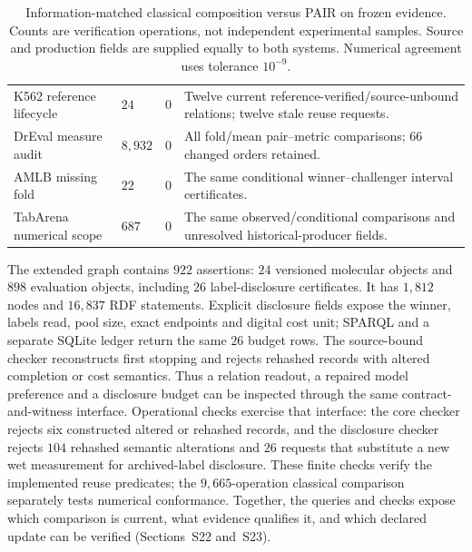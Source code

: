 \begin{table}[htbp]
\centering\small{}
\caption{Information-matched classical composition versus PAIR on frozen evidence. Counts are verification operations, not independent experimental samples. Source and production fields are supplied equally to both systems. Numerical agreement uses tolerance $10^{-9}$.}
\label{tab:matchedsystems}
\begin{tabularx}{\textwidth}{@{}L{0.22\textwidth}N{0.12\textwidth}N{0.15\textwidth}X@{}}
\toprule
{} &  &  & \\\midrule
K562 reference lifecycle & $24$ & $0$ & Twelve current reference-verified/source-unbound relations; twelve stale reuse requests.\\
DrEval measure audit & $8{,}932$ & $0$ & All fold/mean pair--metric comparisons; $66$ changed orders retained.\\
AMLB missing fold & $22$ & $0$ & The same conditional winner--challenger interval certificates.\\
TabArena numerical scope & $687$ & $0$ & The same observed/conditional comparisons and unresolved historical-producer fields.\\\bottomrule
\end{tabularx}
\end{table}

The extended graph contains $922$ assertions: $24$ versioned molecular objects and $898$ evaluation objects, including $26$ label-disclosure certificates. It has $1{,}812$ nodes and $16{,}837$ RDF statements. Explicit disclosure fields expose the winner, labels read, pool size, exact endpoints and digital cost unit; SPARQL and a separate SQLite ledger return the same $26$ budget rows. The source-bound checker reconstructs first stopping and rejects rehashed records with altered completion or cost semantics. Thus a relation readout, a repaired model preference and a disclosure budget can be inspected through the same contract-and-witness interface. Operational checks exercise that interface: the core checker rejects six constructed altered or rehashed records, and the disclosure checker rejects $104$ rehashed semantic alterations and $26$ requests that substitute a new wet measurement for archived-label disclosure. These finite checks verify the implemented reuse predicates; the $9{,}665$-operation classical comparison separately tests numerical conformance. Together, the queries and checks expose which comparison is current, what evidence qualifies it, and which declared update can be verified (Sections~S22 and~S23).

